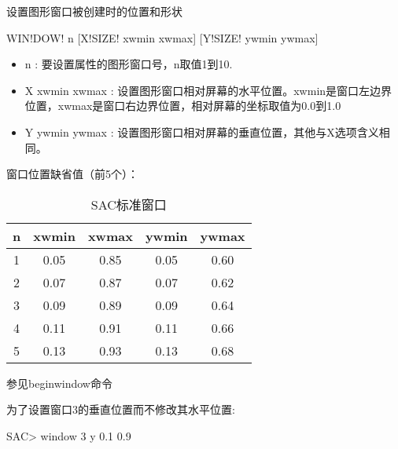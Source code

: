 \label{cmd:window}

设置图形窗口被创建时的位置和形状

\begin{SACSTX}
WIN!DOW! n [X!SIZE! xwmin xwmax]  [Y!SIZE! ywmin ywmax]
\end{SACSTX}

\begin{itemize}
\item n : 要设置属性的图形窗口号，n取值1到10. 
\item X xwmin xwmax : 设置图形窗口相对屏幕的水平位置。xwmin是窗口左边界位置，xwmax是窗口右边界位置，相对屏幕的坐标取值为0.0到1.0  
\item Y ywmin ywmax : 设置图形窗口相对屏幕的垂直位置，其他与X选项含义相同。
\end{itemize}

窗口位置缺省值（前5个）： 
\begin{table}[!ht]
\centering
\caption{SAC标准窗口}
\begin{tabular}{ccccc}
\toprule
 n & xwmin & xwmax & ywmin & ywmax  \\
\midrule
 1 & 0.05  & 0.85  & 0.05  & 0.60 \\
 2 & 0.07  & 0.87  & 0.07  & 0.62 \\
 3 & 0.09  & 0.89  & 0.09  & 0.64 \\
 4 & 0.11  & 0.91  & 0.11  & 0.66 \\
 5 & 0.13  & 0.93  & 0.13  & 0.68 \\
\bottomrule
\end{tabular}
\end{table}

参见beginwindow命令

为了设置窗口3的垂直位置而不修改其水平位置:
\begin{SACCode}
SAC> window 3 y 0.1 0.9
\end{SACCode}
